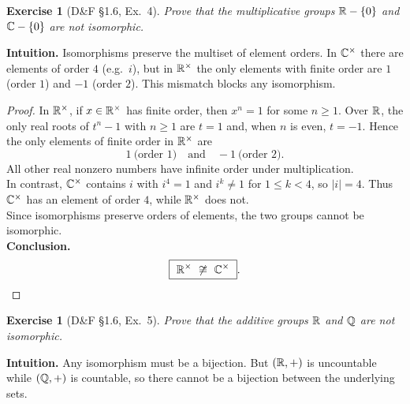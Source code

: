 \documentclass[12pt]{article}
\newtheorem{exercise}[theorem]{Exercise}
\theoremstyle{definition}
\begin{document}
\newpage

\begin{exercise}[D\&F §1.6, Ex.~4]
Prove that the multiplicative groups $\Bbb R-\{0\}$ and $\Bbb C-\{0\}$ are not isomorphic.
\end{exercise}

\dotfill

\noindent\textbf{Intuition.}
Isomorphisms preserve the multiset of element orders. In $\Bbb C^\times$ there are elements of order $4$ (e.g.\ $i$), but in $\Bbb R^\times$ the only elements with finite order are $1$ (order $1$) and $-1$ (order $2$). This mismatch blocks any isomorphism.\\

\dotfill

\begin{proof}
\noindent In $\Bbb R^\times$, if $x\in\Bbb R^\times$ has finite order, then $x^n=1$ for some $n\ge1$. Over $\Bbb R$, the only real roots of $t^n-1$ with $n\ge1$ are $t=1$ and, when $n$ is even, $t=-1$. Hence the only elements of finite order in $\Bbb R^\times$ are
\[
1\ \text{(order 1)}\quad\text{and}\quad -1\ \text{(order 2)}.
\]
All other real nonzero numbers have infinite order under multiplication.\\

\noindent In contrast, $\Bbb C^\times$ contains $i$ with $i^4=1$ and $i^k\neq1$ for $1\le k<4$, so $|i|=4$. Thus $\Bbb C^\times$ has an element of order $4$, while $\Bbb R^\times$ does not.\\

\noindent Since isomorphisms preserve orders of elements, the two groups cannot be isomorphic.\\

\noindent\textbf{Conclusion.}
\[
\boxed{\ \Bbb R^\times\ \not\cong\ \Bbb C^\times\ }.
\]
\end{proof}

\newpage

\begin{exercise}[D\&F §1.6, Ex.~5]
Prove that the additive groups $\Bbb R$ and $\Bbb Q$ are not isomorphic.
\end{exercise}

\dotfill

\noindent\textbf{Intuition.}
Any isomorphism must be a bijection. But $(\Bbb R,+)$ is uncountable while $(\Bbb Q,+)$ is countable, so there cannot be a bijection between the underlying sets.\\
\end{document}
